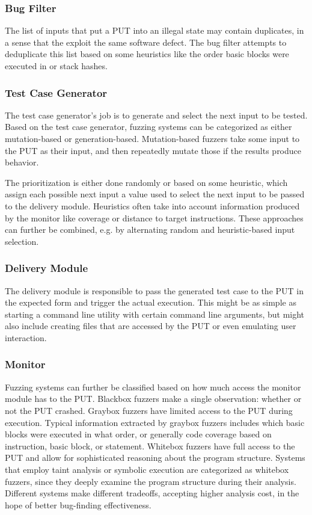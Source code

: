 \documentclass{article}
\begin{document}
\begin{multicols}{2}
    \subsubsection{Bug Filter}
    The list of inputs that put a PUT into an illegal state may contain duplicates, in a sense that the exploit the same software defect. The bug filter attempts to deduplicate this list based on some heuristics like the order basic blocks were executed in or stack hashes.

    \subsubsection{Test Case Generator}
    The test case generator's job is to generate and select the next input to be tested. Based on the test case generator, fuzzing systems can be categorized as either mutation-based or generation-based. Mutation-based fuzzers take some input to the PUT as their input, and then repeatedly mutate those if the results produce  behavior\cite{EvaluatingFuzzTesting}.

    The prioritization is either done randomly or based on some heuristic, which assign each possible next input a value used to select the next input to be passed to the delivery module. Heuristics often take into account information produced by the monitor like coverage or distance to target instructions. These approaches can further be combined, e.g. by alternating random and heuristic-based input selection.

    \subsubsection{Delivery Module}
    The delivery module is responsible to pass the generated test case to the PUT in the expected form and trigger the actual execution. This might be as simple as starting a command line utility with certain command line arguments, but might also include creating files that are accessed by the PUT or even emulating user interaction.

    \subsubsection{Monitor}
    Fuzzing systems can further be classified based on how much access the monitor module has to the PUT. Blackbox fuzzers make a single observation: whether or not the PUT crashed. Graybox fuzzers have limited access to the PUT during execution. Typical information extracted by graybox fuzzers includes which basic blocks were executed in what order, or generally code coverage based on instruction, basic block, or statement. Whitebox fuzzers have full access to the PUT and allow for sophisticated reasoning about the program structure. Systems that employ taint analysis or symbolic execution are categorized as whitebox fuzzers, since they deeply examine the program structure during their analysis. Different systems make different tradeoffs, accepting higher analysis cost, in the hope of better bug-finding effectiveness.\cite{EvaluatingFuzzTesting}


\end{multicols}
\end{document}
